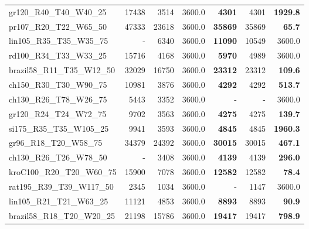 \documentclass{ro}
\begin{document}
\begin{table}[!htb]
\begin{tabular}{lr@{\hspace{0.5\tabcolsep}}r@{\hspace{\tabcolsep}}r@{\hspace{3.0\tabcolsep}}r@{\hspace{0.3\tabcolsep}}r@{\hspace{0.5\tabcolsep}}r}
		gr120\_R40\_T40\_W40\_25    & 17438                 & 3514  & 3600.0 & \textbf{4301}         & 4301                  & \textbf{1929.8} \\
		pr107\_R20\_T22\_W65\_50    & 47333                 & 23618 & 3600.0 & \textbf{35869}        & 35869                 & \textbf{65.7}   \\
		lin105\_R35\_T35\_W35\_75   & - & 6340  & 3600.0 & \textbf{11090}        & 10549                 & 3600.0          \\
		rd100\_R34\_T33\_W33\_25    & 15716                 & 4168  & 3600.0 & \textbf{5970}         & 4989                  & 3600.0          \\
		brazil58\_R11\_T35\_W12\_50 & 32029                 & 16750 & 3600.0 & \textbf{23312}        & 23312                 & \textbf{109.6}  \\
		ch150\_R30\_T30\_W90\_75    & 10981                 & 3876  & 3600.0 & \textbf{4292}         & 4292                  & \textbf{513.7}  \\
		ch130\_R26\_T78\_W26\_75    & 5443                  & 3352  & 3600.0 & - & -                     & 3600.0          \\
		gr120\_R24\_T24\_W72\_75    & 9702                  & 3563  & 3600.0 & \textbf{4275}         & 4275                  & \textbf{139.7}  \\
		si175\_R35\_T35\_W105\_25   & 9941                  & 3593  & 3600.0 & \textbf{4845}         & 4845                  & \textbf{1960.3} \\
		gr96\_R18\_T20\_W58\_75     & 34379                 & 24392 & 3600.0 & \textbf{30015}        & 30015                 & \textbf{467.1}  \\
		ch130\_R26\_T26\_W78\_50    & - & 3408  & 3600.0 & \textbf{4139}         & 4139                  & \textbf{296.0}  \\
		kroC100\_R20\_T20\_W60\_75  & 15900                 & 7078  & 3600.0 & \textbf{12582}        & 12582                 & \textbf{78.4}   \\
		rat195\_R39\_T39\_W117\_50  & 2345                  & 1034  & 3600.0 & - & 1147                  & 3600.0          \\
		lin105\_R21\_T21\_W63\_25   & 11121                 & 4853  & 3600.0 & \textbf{8893}         & 8893                  & \textbf{90.9}   \\
		brazil58\_R18\_T20\_W20\_25 & 21198                 & 15786 & 3600.0 & \textbf{19417}        & 19417                 & \textbf{798.9}  \\

\end{tabular}
\end{table}
\end{document}
